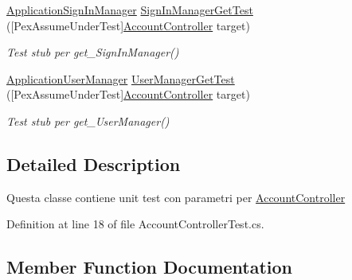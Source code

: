 \begin{DoxyCompactItemize}
\mbox{\hyperlink{class_brew_day2_1_1_application_sign_in_manager}{Application\+Sign\+In\+Manager}} \mbox{\hyperlink{class_brew_day2_1_1_controllers_1_1_tests_1_1_account_controller_test_a5f9bae1594a83c69c8761f50c235eaf8}{Sign\+In\+Manager\+Get\+Test}} (\mbox{[}Pex\+Assume\+Under\+Test\mbox{]}\mbox{\hyperlink{class_brew_day2_1_1_controllers_1_1_account_controller}{Account\+Controller}} target)
\begin{DoxyCompactList}\small\item\em Test stub per get\+\_\+\+Sign\+In\+Manager()\end{DoxyCompactList}\item 
\mbox{\hyperlink{class_brew_day2_1_1_application_user_manager}{Application\+User\+Manager}} \mbox{\hyperlink{class_brew_day2_1_1_controllers_1_1_tests_1_1_account_controller_test_ad0cae168124f66de309444efa89ea958}{User\+Manager\+Get\+Test}} (\mbox{[}Pex\+Assume\+Under\+Test\mbox{]}\mbox{\hyperlink{class_brew_day2_1_1_controllers_1_1_account_controller}{Account\+Controller}} target)
\begin{DoxyCompactList}\small\item\em Test stub per get\+\_\+\+User\+Manager()\end{DoxyCompactList}\end{DoxyCompactItemize}


\subsection{Detailed Description}
Questa classe contiene unit test con parametri per \mbox{\hyperlink{class_brew_day2_1_1_controllers_1_1_account_controller}{Account\+Controller}}



Definition at line 18 of file Account\+Controller\+Test.\+cs.



\subsection{Member Function Documentation}
\mbox{\label{class_brew_day2_1_1_controllers_1_1_tests_1_1_account_controller_test_a749ece77607e679e5c6c93212b1958c8}} 
